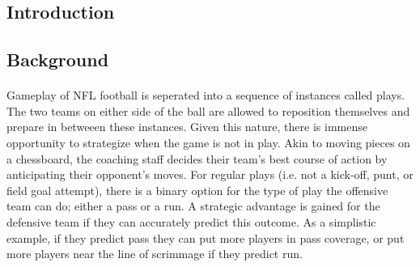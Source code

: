 \documentclass[11pt]{article}
\begin{document}
    \begin{multicols*}{2}
    
    \section{Introduction}

        \subsection{Background}
            
            \paragraph{}
                Gameplay of NFL football is seperated into a sequence of instances called plays. 
                The two teams on either side of the ball are allowed to reposition themselves and prepare in betweeen these instances. 
                Given this nature, there is immense opportunity to strategize when the game is not in play.
                Akin to moving pieces on a chessboard, the coaching staff decides their team's best course of action by anticipating their opponent's moves.  
                For regular plays (i.e. not a kick-off, punt, or field goal attempt), there is a binary option for the type of play the offensive team can do; either a pass or a run.
                A strategic advantage is gained for the defensive team if they can accurately predict this outcome. 
                As a simplistic example, if they predict pass they can put more players in pass coverage, or put more players near the line of scrimmage if they predict run.
            
            \vspace{-10pt}


\end{multicols*}
\end{document}
